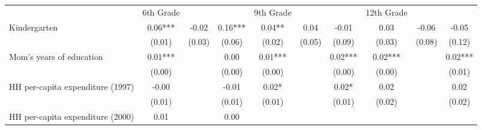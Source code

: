 \begin{tabular}{llllllllll}
\cline{1-10}
\multicolumn{1}{c}{} &
  \multicolumn{1}{|r}{6th Grade} &
  \multicolumn{1}{r}{} &
  \multicolumn{1}{r}{} &
  \multicolumn{1}{r}{9th Grade} &
  \multicolumn{1}{r}{} &
  \multicolumn{1}{r}{} &
  \multicolumn{1}{r}{12th Grade} &
  \multicolumn{1}{r}{} &
  \multicolumn{1}{r}{} \\
\cline{1-10}
\multicolumn{1}{l}{Kindergarten} &
  \multicolumn{1}{|c}{0.06***} &
  \multicolumn{1}{c}{-0.02 } &
  \multicolumn{1}{c}{0.16***} &
  \multicolumn{1}{c}{0.04** } &
  \multicolumn{1}{c}{0.04 } &
  \multicolumn{1}{c}{-0.01 } &
  \multicolumn{1}{c}{0.03 } &
  \multicolumn{1}{c}{-0.06 } &
  \multicolumn{1}{c}{-0.05 } \\
\multicolumn{1}{l}{} &
  \multicolumn{1}{|c}{(0.01)} &
  \multicolumn{1}{c}{(0.03)} &
  \multicolumn{1}{c}{(0.06)} &
  \multicolumn{1}{c}{(0.02)} &
  \multicolumn{1}{c}{(0.05)} &
  \multicolumn{1}{c}{(0.09)} &
  \multicolumn{1}{c}{(0.03)} &
  \multicolumn{1}{c}{(0.08)} &
  \multicolumn{1}{c}{(0.12)} \\
\multicolumn{1}{l}{Mom's years of education} &
  \multicolumn{1}{|c}{0.01***} &
  \multicolumn{1}{c}{} &
  \multicolumn{1}{c}{0.00 } &
  \multicolumn{1}{c}{0.01***} &
  \multicolumn{1}{c}{} &
  \multicolumn{1}{c}{0.02***} &
  \multicolumn{1}{c}{0.02***} &
  \multicolumn{1}{c}{} &
  \multicolumn{1}{c}{0.02***} \\
\multicolumn{1}{l}{} &
  \multicolumn{1}{|c}{(0.00)} &
  \multicolumn{1}{c}{} &
  \multicolumn{1}{c}{(0.00)} &
  \multicolumn{1}{c}{(0.00)} &
  \multicolumn{1}{c}{} &
  \multicolumn{1}{c}{(0.00)} &
  \multicolumn{1}{c}{(0.00)} &
  \multicolumn{1}{c}{} &
  \multicolumn{1}{c}{(0.01)} \\
\multicolumn{1}{l}{HH per-capita expenditure (1997)} &
  \multicolumn{1}{|c}{-0.00 } &
  \multicolumn{1}{c}{} &
  \multicolumn{1}{c}{-0.01 } &
  \multicolumn{1}{c}{0.02* } &
  \multicolumn{1}{c}{} &
  \multicolumn{1}{c}{0.02* } &
  \multicolumn{1}{c}{0.02 } &
  \multicolumn{1}{c}{} &
  \multicolumn{1}{c}{0.02 } \\
\multicolumn{1}{l}{} &
  \multicolumn{1}{|c}{(0.01)} &
  \multicolumn{1}{c}{} &
  \multicolumn{1}{c}{(0.01)} &
  \multicolumn{1}{c}{(0.01)} &
  \multicolumn{1}{c}{} &
  \multicolumn{1}{c}{(0.01)} &
  \multicolumn{1}{c}{(0.02)} &
  \multicolumn{1}{c}{} &
  \multicolumn{1}{c}{(0.02)} \\
\multicolumn{1}{l}{HH per-capita expenditure (2000)} &
  \multicolumn{1}{|c}{0.01 } &
  \multicolumn{1}{c}{} &
  \multicolumn{1}{c}{0.00 } &

\end{tabular}
